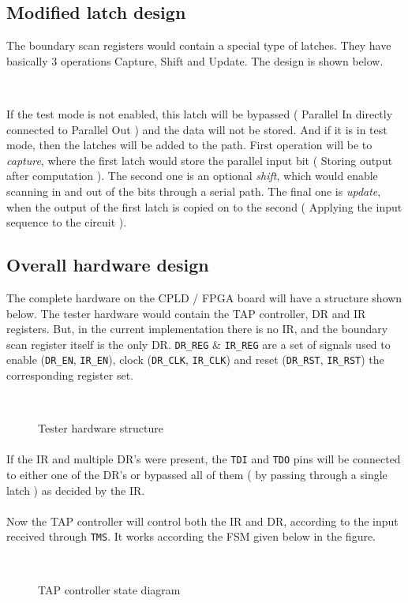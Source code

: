 \documentclass{article}
\begin{document}
\subsection{Modified latch design}
The boundary scan registers would contain a special type of latches. They have basically 3 operations Capture, Shift and Update. The design is shown below.

\begin{figure}[h!]
\centering
\\
\end{figure}

If the test mode is not enabled, this latch will be bypassed ( Parallel In directly connected to Parallel Out ) and the data will not be stored. And if it is in test mode, then the latches will be added to the path. First operation will be to \textit{capture}, where the first latch would store the parallel input bit ( Storing output after computation ). The second one is an optional \textit{shift}, which would enable scanning in and out of the bits through a serial path. The final one is \textit{update}, when the output of the first latch is copied on to the second ( Applying the input sequence to the circuit ).

\subsection{Overall hardware design}
The complete hardware on the CPLD / FPGA board will have a structure shown below. The tester hardware would contain the TAP controller, DR and IR registers. 
But, in the current implementation there is no IR, and the boundary scan register itself is the only DR. \texttt{DR\_REG} \& \texttt{IR\_REG} are a set of signals used to enable (\texttt{DR\_EN}, \texttt{IR\_EN}), clock (\texttt{DR\_CLK}, \texttt{IR\_CLK}) and reset (\texttt{DR\_RST}, \texttt{IR\_RST}) the corresponding register set.
\begin{figure}[h!]
\centering
\\
\caption{Tester hardware structure}
\end{figure}


\paragraph*{}
If the IR and multiple DR's were present, the \texttt{TDI} and \texttt{TDO} pins will be connected to either one of the DR's or bypassed all of them ( by passing through a single latch ) as decided by the IR.

\paragraph*{}
Now the TAP controller will control both the IR and DR, according to the input received through  \texttt{TMS}. It works according the FSM given below in the figure.
\begin{figure}[h!]
\centering
\\
\caption{TAP controller state diagram}
\end{figure}
\end{document}
